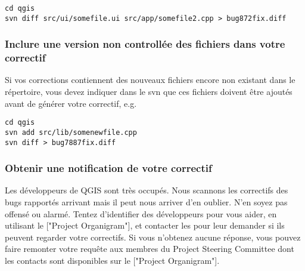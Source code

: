 \begin{verbatim}
cd qgis
svn diff src/ui/somefile.ui src/app/somefile2.cpp > bug872fix.diff
\end{verbatim}

\subsubsection{Inclure une version non controll\'ee des fichiers dans votre correctif}
Si vos corrections contiennent des nouveaux fichiers encore non existant dans le r\'epertoire, vous devez indiquer dans le svn que ces fichiers doivent \^etre ajout\'es avant de g\'en\'erer votre correctif, e.g.

\begin{verbatim}
cd qgis
svn add src/lib/somenewfile.cpp
svn diff > bug7887fix.diff
\end{verbatim}

\subsubsection{Obtenir une notification de votre correctif}
Les d\'eveloppeurs de QGIS sont tr\`es occup\'es. Nous scannons les correctifs des bugs rapport\'es arrivant mais il peut nous arriver d'en oublier. N'en soyez pas offens\'e ou alarm\'e. Tentez d'identifier des d\'eveloppeurs pour vous aider, en utilisant le ["Project Organigram"], et contacter les pour leur demander si ils peuvent regarder votre correctifs. Si vous n'obtenez aucune r\'eponse, vous pouvez faire remonter votre requ\^ete aux membres du Project Steering Committee dont les contacts sont disponibles sur le ["Project Organigram"].


